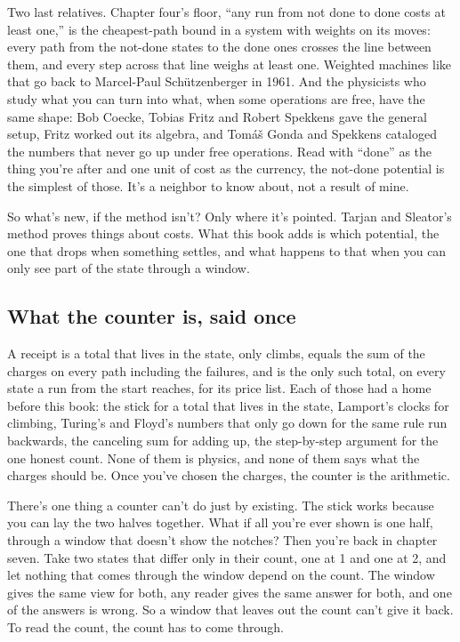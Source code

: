 \documentclass[11pt,twoside]{article}
\theoremstyle{thielethm}
\theoremstyle{thieledef}
\theoremstyle{thieledef}
\theoremstyle{thieledef}
\theoremstyle{thielethm}
\theoremstyle{thieleobs}
\theoremstyle{thielethm}
\begin{document}
Two last relatives. Chapter four's floor, ``any run from not done to done costs at least one,'' is the cheapest-path bound in a system with weights on its moves: every path from the not-done states to the done ones crosses the line between them, and every step across that line weighs at least one. Weighted machines like that go back to Marcel-Paul Schützenberger in 1961. And the physicists who study what you can turn into what, when some operations are free, have the same shape: Bob Coecke, Tobias Fritz and Robert Spekkens gave the general setup, Fritz worked out its algebra, and Tomáš Gonda and Spekkens cataloged the numbers that never go up under free operations. Read with ``done'' as the thing you're after and one unit of cost as the currency, the not-done potential is the simplest of those. It's a neighbor to know about, not a result of mine.

So what's new, if the method isn't? Only where it's pointed. Tarjan and Sleator's method proves things about costs. What this book adds is which potential, the one that drops when something settles, and what happens to that when you can only see part of the state through a window.

\subsection{What the counter is, said once}

A receipt is a total that lives in the state, only climbs, equals the sum of the charges on every path including the failures, and is the only such total, on every state a run from the start reaches, for its price list. Each of those had a home before this book: the stick for a total that lives in the state, Lamport's clocks for climbing, Turing's and Floyd's numbers that only go down for the same rule run backwards, the canceling sum for adding up, the step-by-step argument for the one honest count. None of them is physics, and none of them says what the charges should be. Once you've chosen the charges, the counter is the arithmetic.

There's one thing a counter can't do just by existing. The stick works because you can lay the two halves together. What if all you're ever shown is one half, through a window that doesn't show the notches? Then you're back in chapter seven. Take two states that differ only in their count, one at 1 and one at 2, and let nothing that comes through the window depend on the count. The window gives the same view for both, any reader gives the same answer for both, and one of the answers is wrong. So a window that leaves out the count can't give it back. To read the count, the count has to come through.
\end{document}
